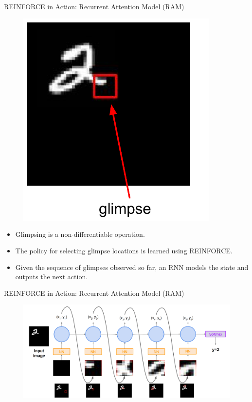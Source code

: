 \begin{frame}{REINFORCE in Action: Recurrent Attention Model (RAM)}
    \begin{figure}
        \centering
        \includegraphics[width=0.9\textwidth,height=0.6\textheight,keepaspectratio]{images/policygrad+reinforce+actor/ram_1.png}
    \end{figure}
    \begin{itemize}
        \item Glimpsing is a non-differentiable operation.
        \item The policy for selecting glimpse locations is learned using REINFORCE.
        \item Given the sequence of glimpses observed so far, an RNN models the state and outputs the next action.
    \end{itemize}
    \footnotetext{[Mnih et al., 2014]}
\end{frame}

\begin{frame}{REINFORCE in Action: Recurrent Attention Model (RAM)}
    \begin{figure}
        \centering
        \includegraphics[width=1.0\textwidth,height=1.0\textheight,keepaspectratio]{images/policygrad+reinforce+actor/ram_2.png}
    \end{figure}
    \footnotetext{[Mnih et al., 2014]}
\end{frame}
